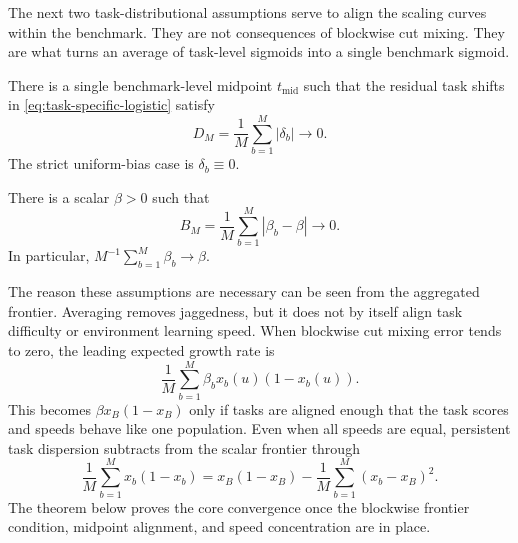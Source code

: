 The next two task-distributional assumptions serve to align the scaling curves within the benchmark. They are not consequences of blockwise cut mixing. They are what turns an average of task-level sigmoids into a single benchmark sigmoid.

\begin{assumption}
\label{assum:uniform-log-time-bias}
There is a single benchmark-level midpoint \(t_{\mathrm{mid}}\) such that the residual task shifts in \eqref{eq:task-specific-logistic} satisfy
\begin{equation*}
    D_M=\frac1M\sum_{b=1}^{M}|\delta_b|\to0.
\end{equation*}
The strict uniform-bias case is $\delta_b\equiv0$.
\end{assumption}

\begin{assumption}
\label{assum:concentrated-speed}
There is a scalar $\beta>0$ such that
\begin{equation*}
    B_M=\frac1M\sum_{b=1}^{M}|\beta_b-\beta|\to0.
\end{equation*}
In particular, $M^{-1}\sum_{b=1}^{M}\beta_b\to\beta$.
\end{assumption}

The reason these assumptions are necessary can be seen from the aggregated frontier. Averaging removes jaggedness, but it does not by itself align task difficulty or environment learning speed. When blockwise cut mixing error tends to zero, the leading expected growth rate is
\begin{equation*}
    \frac1M\sum_{b=1}^{M}\beta_b x_b(u)(1-x_b(u)).
\end{equation*}
This becomes $\beta x_B(1-x_B)$ only if tasks are aligned enough that the task scores and speeds behave like one population. Even when all speeds are equal, persistent task dispersion subtracts from the scalar frontier through
\begin{equation*}
    \frac1M\sum_{b=1}^{M}x_b(1-x_b)
    =x_B(1-x_B)-\frac1M\sum_{b=1}^{M}(x_b-x_B)^2.
\end{equation*}
The theorem below proves the core convergence once the blockwise frontier condition, midpoint alignment, and speed concentration are in place.


